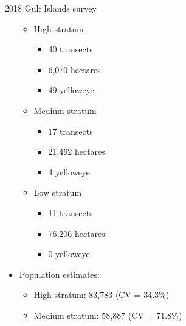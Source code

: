 \documentclass[
  ignorenonframetext,
]{beamer}
\providecommand{\tightlist}{%
  \setlength{\itemsep}{0pt}\setlength{\parskip}{0pt}}
\begin{document}
\begin{frame}{2018 Gulf Islands survey}
\begin{itemize}
  \begin{itemize}
  \tightlist
  \item
    High stratum

    \begin{itemize}
    \tightlist
    \item
      40 transects
    \item
      6,070 hectares
    \item
      49 yelloweye
    \end{itemize}
  \item
    Medium stratum

    \begin{itemize}
    \tightlist
    \item
      17 transects
    \item
      21,462 hectares
    \item
      4 yelloweye
    \end{itemize}
  \item
    Low stratum

    \begin{itemize}
    \tightlist
    \item
      11 transects
    \item
      76,206 hectares
    \item
      0 yelloweye
    \end{itemize}
  \end{itemize}
\item
  Population estimates:

  \begin{itemize}
  \tightlist
  \item
    High stratum: 83,783 (CV = 34.3\%)
  \item
    Medium stratum: 58,887 (CV = 71.8\%)
  \end{itemize}
\end{itemize}
\end{frame}
\end{document}
